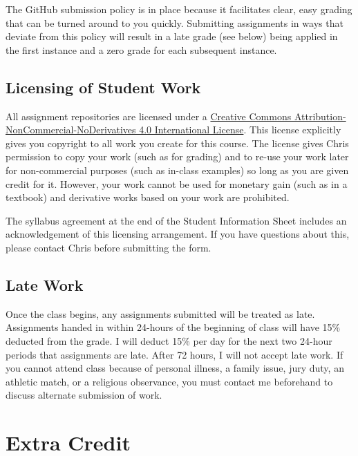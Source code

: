 \documentclass[]{book}
\theoremstyle{definition}
\theoremstyle{definition}
\theoremstyle{definition}
\theoremstyle{remark}
\begin{document}
The GitHub submission policy is in place because it facilitates clear,
easy grading that can be turned around to you quickly. Submitting
assignments in ways that deviate from this policy will result in a late
grade (see below) being applied in the first instance and a zero grade
for each subsequent instance.

\hypertarget{licensing-of-student-work}{%
\subsection{Licensing of Student Work}\label{licensing-of-student-work}}

All assignment repositories are licensed under a
\href{https://creativecommons.org/licenses/by-nc-nd/4.0/}{Creative
Commons Attribution-NonCommercial-NoDerivatives 4.0 International
License}. This license explicitly gives you copyright to all work you
create for this course. The license gives Chris permission to copy your
work (such as for grading) and to re-use your work later for
non-commercial purposes (such as in-class examples) so long as you are
given credit for it. However, your work cannot be used for monetary gain
(such as in a textbook) and derivative works based on your work are
prohibited.

The syllabus agreement at the end of the Student Information Sheet
includes an acknowledgement of this licensing arrangement. If you have
questions about this, please contact Chris before submitting the form.

\hypertarget{late-work}{%
\subsection{Late Work}\label{late-work}}

Once the class begins, any assignments submitted will be treated as
late. Assignments handed in within 24-hours of the beginning of class
will have 15\% deducted from the grade. I will deduct 15\% per day for
the next two 24-hour periods that assignments are late. After 72 hours,
I will not accept late work. If you cannot attend class because of
personal illness, a family issue, jury duty, an athletic match, or a
religious observance, you must contact me beforehand to discuss
alternate submission of work.

\hypertarget{extra-credit}{%
\section{Extra Credit}\label{extra-credit}}
\end{document}

